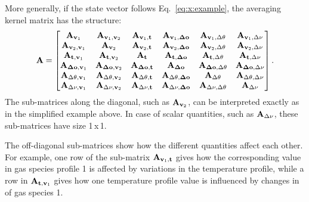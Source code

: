 More generally, if the state vector follows Eq.~\ref{eq:x:example}, the
averaging kernel matrix has the structure:
\begin{equation}
  \label{eq:A:example}
  \mathbf{A} =
  \begin{bmatrix}
    \mathbf{A}_{\mathbf{v}_1} & \mathbf{A}_{\mathbf{v}_1,\mathbf{v}_2} &
    \mathbf{A}_{\mathbf{v}_1,\mathbf{t}} & \mathbf{A}_{\mathbf{v}_1,\mathbf{\Delta\mathbf{o}}} &
    \mathbf{A}_{\mathbf{v}_1,\Delta\theta} & \mathbf{A}_{\mathbf{v}_1,\Delta\nu} \\ 
    \mathbf{A}_{\mathbf{v}_2,\mathbf{v}_1} & \mathbf{A}_{\mathbf{v}_2} &
    \mathbf{A}_{\mathbf{v}_2,\mathbf{t}} & \mathbf{A}_{\mathbf{v}_2,\mathbf{\Delta\mathbf{o}}} &
    \mathbf{A}_{\mathbf{v}_2,\Delta\theta} & \mathbf{A}_{\mathbf{v}_2,\Delta\nu} \\ 
    \mathbf{A}_{\mathbf{t},\mathbf{v}_1} & \mathbf{A}_{\mathbf{t},\mathbf{v}_2} &
    \mathbf{A}_{\mathbf{t}} & \mathbf{A}_{\mathbf{t},\mathbf{\Delta\mathbf{o}}} &
    \mathbf{A}_{\mathbf{t},\Delta\theta} & \mathbf{A}_{\mathbf{t},\Delta\nu} \\ 
    \mathbf{A}_{\mathbf{\Delta\mathbf{o}},\mathbf{v}_1} & 
    \mathbf{A}_{\mathbf{\Delta\mathbf{o}},\mathbf{v}_2} &
    \mathbf{A}_{\mathbf{\Delta\mathbf{o}},\mathbf{t}} & \mathbf{A}_{\mathbf{\Delta\mathbf{o}}} &
    \mathbf{A}_{\mathbf{\Delta\mathbf{o}},\Delta\theta} &
    \mathbf{A}_{\mathbf{\Delta\mathbf{o}},\Delta\nu} \\ 
    \mathbf{A}_{\Delta\theta,\mathbf{v}_1} & \mathbf{A}_{\Delta\theta,\mathbf{v}_2} &
    \mathbf{A}_{\Delta\theta,\mathbf{t}} & \mathbf{A}_{\Delta\theta,\mathbf{\Delta\mathbf{o}}} &
    \mathbf{A}_{\Delta\theta} & \mathbf{A}_{\Delta\theta,\Delta\nu} \\ 
    \mathbf{A}_{\Delta\nu,\mathbf{v}_1} & \mathbf{A}_{\Delta\nu,\mathbf{v}_2} &
    \mathbf{A}_{\Delta\nu,\mathbf{t}} & \mathbf{A}_{\Delta\nu,\mathbf{\Delta\mathbf{o}}} &
    \mathbf{A}_{\Delta\nu,\Delta\theta} & \mathbf{A}_{\Delta\nu}
  \end{bmatrix}.
\end{equation}
The sub-matrices along the diagonal, such as $\mathbf{A}_{\mathbf{v}_2}$, can
be interpreted exactly as in the simplified example above. In case of scalar
quantities, such as $\mathbf{A}_{\Delta\nu}$, these sub-matrices have size 1\,x\,1.

The off-diagonal sub-matrices show how the different quantities affect each
other. For example, one row of the sub-matrix
$\mathbf{A}_{\mathbf{v}_1,\mathbf{t}}$ gives how the corresponding value in gas
species profile 1 is affected by variations in the temperature profile, while a
row in $\mathbf{A}_{\mathbf{t},\mathbf{v}_1}$ gives how one temperature profile
value is influenced by changes in of gas species 1.

